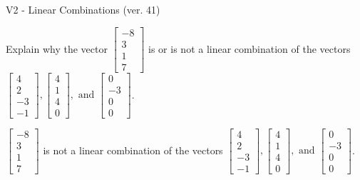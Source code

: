 \begin{exercise}
  \begin{exerciseTitle}V2 - Linear Combinations (ver. 41)\end{exerciseTitle}
  \begin{exerciseStatement}
    Explain why the vector \(\left[\begin{array}{c}
-8 \\
3 \\
1 \\
7
\end{array}\right]\)  is or is not a linear 
	combination of the vectors \(\left[\begin{array}{c}
4 \\
2 \\
-3 \\
-1
\end{array}\right] , \left[\begin{array}{c}
4 \\
1 \\
4 \\
0
\end{array}\right] , \text{ and } \left[\begin{array}{c}
0 \\
-3 \\
0 \\
0
\end{array}\right]\).
	


  \end{exerciseStatement}
  \begin{exerciseAnswer}
   \(\left[\begin{array}{c}
-8 \\
3 \\
1 \\
7
\end{array}\right]\) 
  	 is not  
	a linear combination of the vectors \(\left[\begin{array}{c}
4 \\
2 \\
-3 \\
-1
\end{array}\right] , \left[\begin{array}{c}
4 \\
1 \\
4 \\
0
\end{array}\right] , \text{ and } \left[\begin{array}{c}
0 \\
-3 \\
0 \\
0
\end{array}\right]\).

	
  


  \end{exerciseAnswer}
\end{exercise}